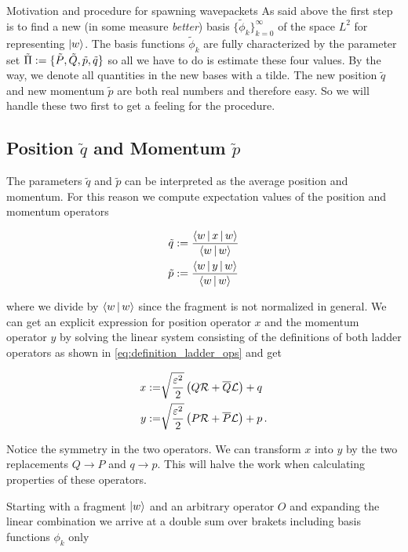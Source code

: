 \begin{chapter}{Motivation and procedure for spawning wavepackets}
As said above the first step is to find a new (in some measure \emph{better})
basis $\{\tilde{\phi}_k\}_{k=0}^\infty$ of the space $L^2$ for representing $\Ket{w}$.
The basis functions $\tilde{\phi}_k$ are fully characterized by the parameter set
$\tilde{\Pi} := \{\tilde{P},\tilde{Q},\tilde{p},\tilde{q}\}$ so all we have
to do is estimate these four values. By the way, we denote all quantities in the
new bases with a tilde. The new position $\tilde{q}$ and new momentum $\tilde{p}$
are both real numbers and therefore easy. So we will handle these two first to
get a feeling for the procedure.


\subsection{Position $\tilde{q}$ and Momentum $\tilde{p}$}

The parameters $\tilde{q}$ and $\tilde{p}$ can be interpreted as the average position
and momentum. For this reason we compute expectation values of the position and momentum
operators

\begin{align}
  \tilde{q} & := \frac{\Braket{w | x | w}}{\Braket{w|w}} \\
  \tilde{p} & := \frac{\Braket{w | y | w}}{\Braket{w|w}}
\end{align}

where we divide by $\Braket{w|w}$ since the fragment is not normalized in general.
We can get an explicit expression for position operator $x$ and the momentum
operator $y$ by solving the linear system consisting of the definitions of both
ladder operators as shown in \eqref{eq:definition_ladder_ops} and get

\begin{equation}
\label{eq:definition_pos_and_mom_ops}
\begin{split}
  x := & \sqrt{\frac{\varepsilon^2}{2}} \left(Q \mathcal{R} + \overline{Q} \mathcal{L}\right) + q \\
  y := & \sqrt{\frac{\varepsilon^2}{2}} \left(P \mathcal{R} + \overline{P} \mathcal{L}\right) + p \,.
\end{split}
\end{equation}

Notice the symmetry in the two operators. We can transform $x$ into $y$ by the two
replacements $Q \rightarrow P$ and $q \rightarrow p$. This will halve the work
when calculating properties of these operators.

Starting with a fragment $\Ket{w}$ and an arbitrary operator $O$ and expanding the
linear combination we arrive at a double sum over brakets including basis functions
$\phi_k$ only


\end{chapter}
